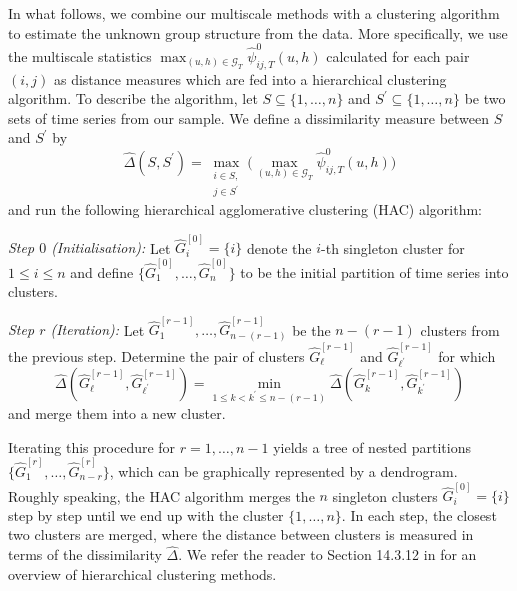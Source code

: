 \documentclass[12pt]{article}
\begin{document}
In what follows, we combine our multiscale methods with a clustering algorithm to estimate the unknown group structure from the data. More specifically, we use the multiscale statistics $\max_{(u, h) \in \mathcal{G}_T}\widehat{\psi}^0_{ij, T}(u, h)$ calculated for each pair $(i,j)$ as distance measures which are fed into a hierarchical clustering algorithm. To describe the algorithm, let $S \subseteq \{1,\ldots, n\}$ and $S^\prime \subseteq \{1,\ldots, n\}$ be two sets of time series from our sample. We define a dissimilarity measure between $S$ and $S^\prime$ by 
\begin{equation}\label{dissimilarity}
\widehat{\Delta}(S,S^\prime) = \max_{\substack{i \in S, \\ j \in S^\prime}} \Big(\max_{(u, h) \in \mathcal{G}_T}\widehat{\psi}^0_{ij, T}(u, h)\Big) 
\end{equation}
and run the following hierarchical agglomerative clustering (HAC) algorithm: 
\vspace{3pt}

\noindent \textit{Step $0$ (Initialisation):} Let $\widehat{G}_i^{[0]} = \{ i \}$ denote the $i$-th singleton cluster for $1 \le i \le n$ and define $\{\widehat{G}_1^{[0]},\ldots,\widehat{G}_n^{[0]} \}$ to be the initial partition of time series into clusters. 

\noindent \textit{Step $r$ (Iteration):} Let $\widehat{G}_1^{[r-1]},\ldots,\widehat{G}_{n-(r-1)}^{[r-1]}$ be the $n-(r-1)$ clusters from the previous step. Determine the pair of clusters $\widehat{G}_{\ell}^{[r-1]}$ and $\widehat{G}_{{\ell}^\prime}^{[r-1]}$ for which 
\[ \widehat{\Delta}(\widehat{G}_{\ell}^{[r-1]},\widehat{G}_{{\ell}^\prime}^{[r-1]}) = \min_{1 \le k < k^\prime \le n-(r-1)} \widehat{\Delta}(\widehat{G}_{k}^{[r-1]},\widehat{G}_{k^\prime}^{[r-1]}) \]  
and merge them into a new cluster. 
\vspace{3pt}

\noindent Iterating this procedure for $r = 1,\ldots, n-1$ yields a tree of nested partitions $\{\widehat{G}_1^{[r]},\ldots,\widehat{G}_{n-r}^{[r]}\}$, which can be graphically represented by a dendrogram. Roughly speaking, the HAC algorithm merges the $n$ singleton clusters $\widehat{G}_i^{[0]} = \{ i \}$ step by step until we end up with the cluster $\{1,\ldots, n\}$. In each step, the closest two clusters are merged, where the distance between clusters is measured in terms of the dissimilarity $\widehat{\Delta}$. We refer the reader to Section 14.3.12 in \cite{HastieTibshiraniFriedman2009} for an overview of hierarchical clustering methods. 
\end{document}

